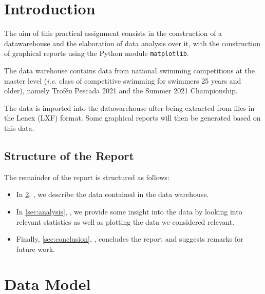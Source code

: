 \documentclass[a4paper, 11pt]{article}
\begin{document}
\pagebreak

\tableofcontents \pagebreak
\listoffigures \pagebreak


\section{Introduction}

The aim of this practical assignment consists in the construction of a datawarehouse and the elaboration of data analysis over it, with the construction of graphical reports using the Python module \texttt{matplotlib}.

The data warehouse contains data from national swimming competitions at the master level (\textit{i.e.} class of
competitive swimming for swimmers 25 years and older), namely Troféu Pescada 2021 and the Summer 2021 Championship.

The data is imported into the datawarehouse after being extracted from files in the Lenex (LXF) format. Some graphical reports will then be generated based on this data.

\vspace{\baselineskip}

\subsection*{Structure of the Report}

The remainder of the report is structured as follows:

\begin{itemize}
    \item In \cref{sec:data-model}, \textbf{}, we describe the data contained in the data warehouse.
    \item In \cref{sec:analysis}, \textbf{}, we provide some insight into the data by looking into relevant
    statistics as well as plotting the data we considered relevant.
    \item Finally, \cref{sec:conclusion}, \textbf{}, concludes the report and suggests remarks
    for future work.
\end{itemize}

\pagebreak

\section{Data Model} \label{sec:data-model}
\end{document}
